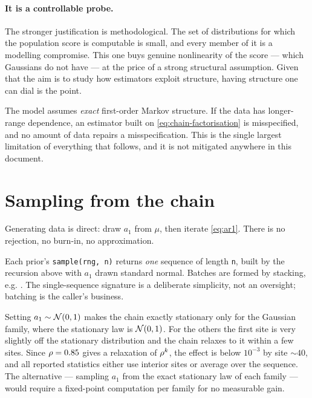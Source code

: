 \paragraph{It is a controllable probe.} The stronger justification is methodological. The set
of distributions for which the population score is computable is small, and every member of it
is a modelling compromise. This one buys genuine nonlinearity of the score --- which
Gaussians do not have --- at the price of a strong structural assumption. Given that the aim
is to study how estimators exploit structure, having structure one can dial is the point.

\begin{pitfall}
The model assumes \emph{exact} first-order Markov structure. If the data has longer-range
dependence, an estimator built on \eqref{eq:chain-factorisation} is misspecified, and no
amount of data repairs a misspecification. This is the single largest limitation of everything
that follows, and it is not mitigated anywhere in this document.
\end{pitfall}

\section{Sampling from the chain}

Generating data is direct: draw $a_1$ from $\mu$, then iterate \eqref{eq:ar1}. There is no
rejection, no burn-in, no approximation.

\begin{codebox}
Each prior's \texttt{sample(rng, n)} returns \emph{one} sequence of length \texttt{n}, built
by the recursion above with $a_1$ drawn standard normal. Batches are formed by stacking, e.g.
. The single-sequence
signature is a deliberate simplicity, not an oversight; batching is the caller's business.
\end{codebox}

\begin{remark}
Setting $a_1\sim\mathcal{N}\!\left(0,1\right)$ makes the chain exactly stationary only for the Gaussian family,
where the stationary law is $\mathcal{N}\!\left(0,1\right)$. For the others the first site is very slightly off
the stationary distribution and the chain relaxes to it within a few sites. Since $\rho=0.85$
gives a relaxation of $\rho^k$, the effect is below $10^{-3}$ by site $\sim40$, and all
reported statistics either use interior sites or average over the sequence. The alternative ---
sampling $a_1$ from the exact stationary law of each family --- would require a fixed-point
computation per family for no measurable gain.
\end{remark}
